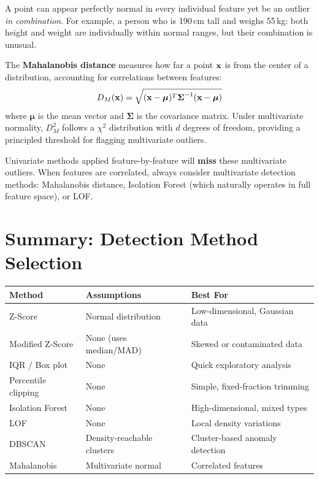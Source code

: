 \begin{remark}
A point can appear perfectly normal in every individual feature yet be an outlier \textit{in combination}. For example, a person who is 190\,cm tall and weighs 55\,kg: both height and weight are individually within normal ranges, but their combination is unusual.
\end{remark}

\begin{definition}
The \textbf{Mahalanobis distance} measures how far a point $\mathbf{x}$ is from the center of a distribution, accounting for correlations between features:
$$D_M(\mathbf{x}) = \sqrt{(\mathbf{x} - \boldsymbol{\mu})^T \boldsymbol{\Sigma}^{-1} (\mathbf{x} - \boldsymbol{\mu})}$$
where $\boldsymbol{\mu}$ is the mean vector and $\boldsymbol{\Sigma}$ is the covariance matrix. Under multivariate normality, $D_M^2$ follows a $\chi^2$ distribution with $d$ degrees of freedom, providing a principled threshold for flagging multivariate outliers.
\end{definition}

Univariate methods applied feature-by-feature will \textbf{miss} these multivariate outliers. When features are correlated, always consider multivariate detection methods: Mahalanobis distance, Isolation Forest (which naturally operates in full feature space), or LOF.


\section*{Summary: Detection Method Selection}

\begin{center}
\renewcommand{\arraystretch}{1.3}
\begin{tabular}{p{3.2cm} p{3.8cm} p{4.5cm}}
\toprule
\textbf{Method} & \textbf{Assumptions} & \textbf{Best For} \\
\midrule
Z-Score & Normal distribution & Low-dimensional, Gaussian data \\
Modified Z-Score & None (uses median/MAD) & Skewed or contaminated data \\
IQR / Box plot & None & Quick exploratory analysis \\
Percentile clipping & None & Simple, fixed-fraction trimming \\
Isolation Forest & None & High-dimensional, mixed types \\
LOF & None & Local density variations \\
DBSCAN & Density-reachable clusters & Cluster-based anomaly detection \\
Mahalanobis & Multivariate normal & Correlated features \\
\bottomrule
\end{tabular}
\end{center}
